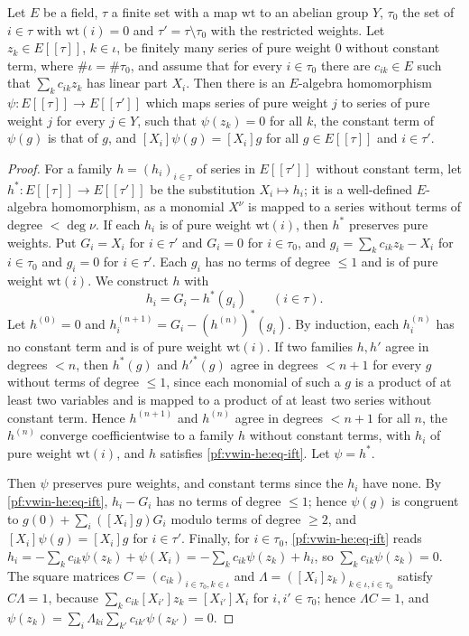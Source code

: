 \begin{lemma}\label{pf:vwin-he:ift}
Let $E$ be a field, $\tau$ a finite set with a map $\mathrm{wt}$ to an abelian group $Y$, $\tau_0$ the set of
$i\in\tau$ with $\mathrm{wt}(i)=0$ and $\tau'=\tau\setminus\tau_0$ with the restricted weights. Let $z_k\in E[[\tau]]$,
$k\in\iota$, be finitely many series of pure weight $0$ without constant term, where $\#\iota=\#\tau_0$, and assume
that for every $i\in\tau_0$ there are $c_{ik}\in E$ such that $\sum_kc_{ik}z_k$ has linear part $X_i$. Then there is an
$E$-algebra homomorphism $\psi:E[[\tau]]\to E[[\tau']]$ which maps series of pure weight $j$ to series of pure weight
$j$ for every $j\in Y$, such that $\psi(z_k)=0$ for all $k$, the constant term of $\psi(g)$ is that of $g$, and
$[X_i]\psi(g)=[X_i]g$ for all $g\in E[[\tau]]$ and $i\in\tau'$.
\end{lemma}

\begin{proof}
For a family $h=(h_i)_{i\in\tau}$ of series in $E[[\tau']]$ without constant term, let $h^*:E[[\tau]]\to E[[\tau']]$
be the substitution $X_i\mapsto h_i$; it is a well-defined $E$-algebra homomorphism, as a monomial $X^\nu$ is mapped
to a series without terms of degree $<\deg\nu$. If each $h_i$ is of pure weight $\mathrm{wt}(i)$, then $h^*$ preserves
pure weights. Put $G_i=X_i$ for $i\in\tau'$ and $G_i=0$ for $i\in\tau_0$, and $g_i=\sum_kc_{ik}z_k-X_i$ for
$i\in\tau_0$ and $g_i=0$ for $i\in\tau'$. Each $g_i$ has no terms of degree $\le1$ and is of pure weight
$\mathrm{wt}(i)$. We construct $h$ with
\begin{equation}\label{pf:vwin-he:eq-ift}
 h_i=G_i-h^*(g_i)\qquad(i\in\tau).
\end{equation}
Let $h^{(0)}=0$ and $h^{(n+1)}_i=G_i-(h^{(n)})^*(g_i)$. By induction, each $h^{(n)}_i$ has no constant term and is of
pure weight $\mathrm{wt}(i)$. If two families $h,h'$ agree in degrees $<n$, then $h^*(g)$ and $h'^*(g)$ agree in
degrees $<n+1$ for every $g$ without terms of degree $\le1$, since each monomial of such a $g$ is a product of at
least two variables and is mapped to a product of at least two series without constant term. Hence $h^{(n+1)}$ and
$h^{(n)}$ agree in degrees $<n+1$ for all $n$, the $h^{(n)}$ converge coefficientwise to a family $h$ without constant
terms, with $h_i$ of pure weight $\mathrm{wt}(i)$, and $h$ satisfies \eqref{pf:vwin-he:eq-ift}. Let $\psi=h^*$.

Then $\psi$ preserves pure weights, and constant terms since the $h_i$ have none. By \eqref{pf:vwin-he:eq-ift},
$h_i-G_i$ has no terms of degree $\le1$; hence $\psi(g)$ is congruent to $g(0)+\sum_i([X_i]g)G_i$ modulo terms of
degree $\ge2$, and $[X_i]\psi(g)=[X_i]g$ for $i\in\tau'$. Finally, for $i\in\tau_0$, \eqref{pf:vwin-he:eq-ift} reads
$h_i=-\sum_kc_{ik}\psi(z_k)+\psi(X_i)=-\sum_kc_{ik}\psi(z_k)+h_i$, so $\sum_kc_{ik}\psi(z_k)=0$. The square matrices
$C=(c_{ik})_{i\in\tau_0,k\in\iota}$ and $\Lambda=([X_i]z_k)_{k\in\iota,i\in\tau_0}$ satisfy $C\Lambda=1$, because
$\sum_kc_{ik}[X_{i'}]z_k=[X_{i'}]X_i$ for $i,i'\in\tau_0$; hence $\Lambda C=1$, and
$\psi(z_k)=\sum_{i}\Lambda_{ki}\sum_{k'}c_{ik'}\psi(z_{k'})=0$.
\end{proof}

